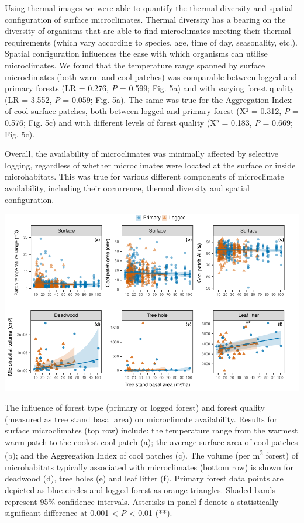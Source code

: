 \documentclass[12pt,a4paper,]{report}
\theoremstyle{definition}
\theoremstyle{definition}
\theoremstyle{definition}
\theoremstyle{remark}
\begin{document}
Using thermal images we were able to quantify the thermal diversity and
spatial configuration of surface microclimates. Thermal diversity has a
bearing on the diversity of organisms that are able to find
microclimates meeting their thermal requirements (which vary according
to species, age, time of day, seasonality, etc.). Spatial configuration
influences the ease with which organisms can utilise microclimates. We
found that the temperature range spanned by surface microclimates (both
warm and cool patches) was comparable between logged and primary forests
(LR = 0.276, \emph{P} = 0.599; Fig. 5a) and with varying forest quality
(LR = 3.552, \emph{P} = 0.059; Fig. 5a). The same was true for the
Aggregation Index of cool surface patches, both between logged and
primary forest (Χ² = 0.312, \emph{P} = 0.576; Fig. 5c) and with
different levels of forest quality (Χ² = 0.183, \emph{P} = 0.669; Fig.
5c).

Overall, the availability of microclimates was minimally affected by
selective logging, regardless of whether microclimates were located at
the surface or inside microhabitats. This was true for various different
components of microclimate availability, including their occurrence,
thermal diversity and spatial configuration.

\begin{center}\includegraphics{./output/fig-4-5-1} \end{center}

The influence of forest type (primary or logged forest) and forest
quality (measured as tree stand basal area) on microclimate
availability. Results for surface microclimates (top row) include: the
temperature range from the warmest warm patch to the coolest cool patch
(a); the average surface area of cool patches (b); and the Aggregation
Index of cool patches (c). The volume (per m\textsuperscript{2} forest)
of microhabitats typically associated with microclimates (bottom row) is
shown for deadwood (d), tree holes (e) and leaf litter (f). Primary
forest data points are depicted as blue circles and logged forest as
orange triangles. Shaded bands represent 95\% confidence intervals.
Asterisks in panel f denote a statistically significant difference at
0.001 \textless{} \emph{P} \textless{} 0.01 (**).
\end{document}
